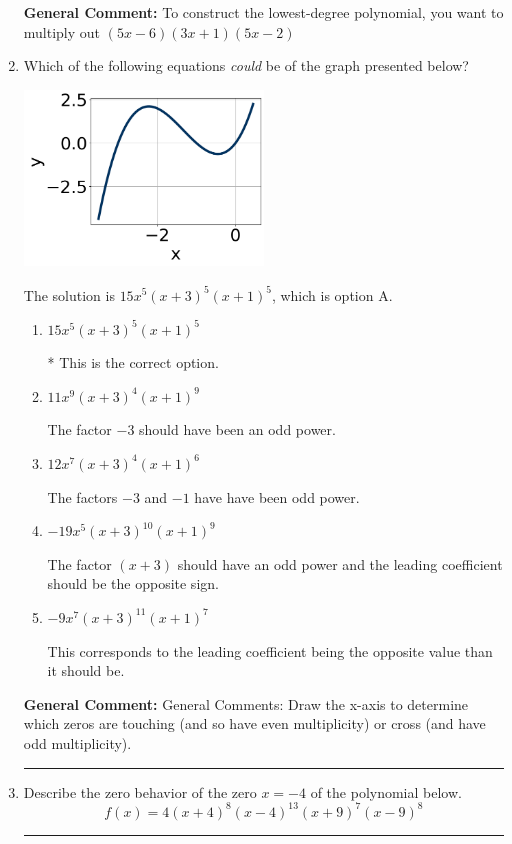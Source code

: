 \documentclass{extbook}[14pt]
\newcommand{\litem}[1]{\item #1

\rule{\textwidth}{0.4pt}}
\begin{document}
\begin{enumerate}
{\textbf{General Comment:} To construct the lowest-degree polynomial, you want to multiply out $(5x -6)(3x + 1)(5x -2)$
}
\litem{
Which of the following equations \textit{could} be of the graph presented below?

\begin{center}
    \includegraphics[width=0.5\textwidth]{../Figures/polyGraphToFunctionC.png}
\end{center}




The solution is \( 15x^{5} (x + 3)^{5} (x + 1)^{5} \), which is option A.\begin{enumerate}[label=\Alph*.]
\item \( 15x^{5} (x + 3)^{5} (x + 1)^{5} \)

* This is the correct option.
\item \( 11x^{9} (x + 3)^{4} (x + 1)^{9} \)

The factor $-3$ should have been an odd power.
\item \( 12x^{7} (x + 3)^{4} (x + 1)^{6} \)

The factors $-3$ and $-1$ have have been odd power.
\item \( -19x^{5} (x + 3)^{10} (x + 1)^{9} \)

The factor $(x + 3)$ should have an odd power and the leading coefficient should be the opposite sign.
\item \( -9x^{7} (x + 3)^{11} (x + 1)^{7} \)

This corresponds to the leading coefficient being the opposite value than it should be.
\end{enumerate}

\textbf{General Comment:} General Comments: Draw the x-axis to determine which zeros are touching (and so have even multiplicity) or cross (and have odd multiplicity).
}
\litem{
Describe the zero behavior of the zero $x = -4$ of the polynomial below.
\[ f(x) = 4(x + 4)^{8}(x - 4)^{13}(x + 9)^{7}(x - 9)^{8} \]

}
\end{enumerate}
\end{document}
